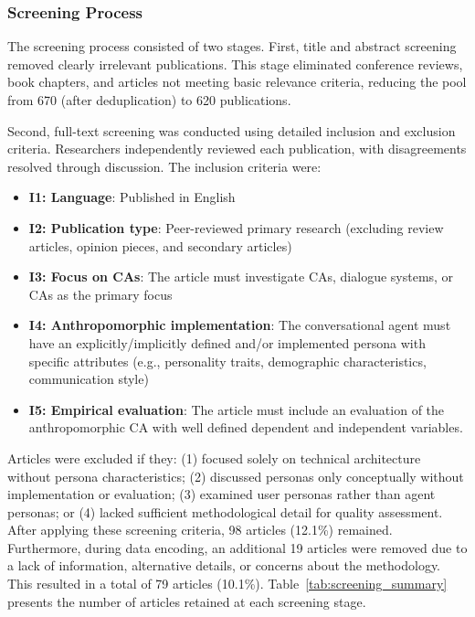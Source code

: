\documentclass[manuscript,anonymous,sigconf]{acmart}
\begin{document}
\subsubsection{Screening Process}

The screening process consisted of two stages. First, title and abstract screening removed clearly irrelevant publications. This stage eliminated conference reviews, book chapters, and articles not meeting basic relevance criteria, reducing the pool from 670 (after deduplication) to 620 publications.

Second, full-text screening was conducted using detailed inclusion and exclusion criteria. Researchers independently reviewed each publication, with disagreements resolved through discussion. The inclusion criteria were:

\begin{itemize}
    \item \textbf{I1: Language}: Published in English
    \item \textbf{I2: Publication type}: Peer-reviewed primary research (excluding review articles, opinion pieces, and secondary articles)
    \item \textbf{I3: Focus on CAs}: The article must investigate CAs, dialogue systems, or CAs as the primary focus
    \item \textbf{I4: Anthropomorphic implementation}: The conversational agent must have an explicitly/implicitly defined and/or implemented persona with specific attributes (e.g., personality traits, demographic characteristics, communication style)
    \item \textbf{I5: Empirical evaluation}: The article must include an evaluation of the anthropomorphic CA with well defined dependent and independent variables.
\end{itemize}

Articles were excluded if they: (1) focused solely on technical architecture without persona characteristics; (2) discussed personas only conceptually without implementation or evaluation; (3) examined user personas rather than agent personas; or (4) lacked sufficient methodological detail for quality assessment.
After applying these screening criteria, 98 articles (12.1\%) remained. Furthermore, during data encoding, an additional 19 articles were removed due to a lack of information, alternative details, or concerns about the methodology. This resulted in a total of 79 articles (10.1\%). Table~\ref{tab:screening_summary} presents the number of articles retained at each screening stage.
\end{document}
